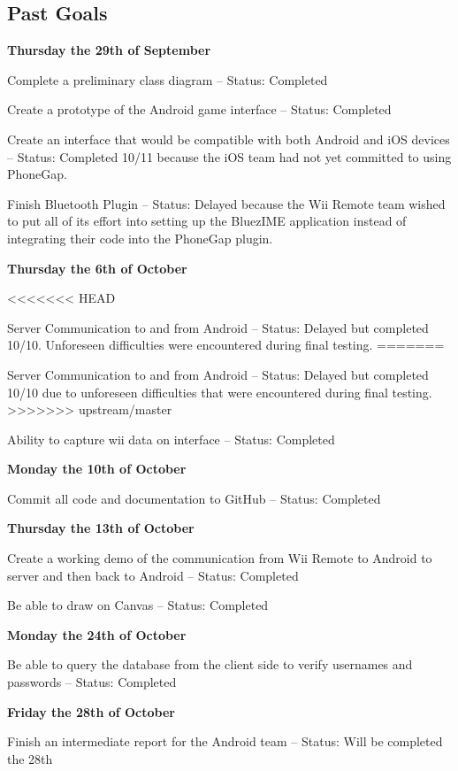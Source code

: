 \documentclass[12pt]{article}
\newenvironment{itemize*}%
  {\begin{itemize}%
  	\setlength{\parsep}{0pt}
    \setlength{\itemsep}{0pt}%
    \setlength{\parskip}{0pt}}%
  {\end{itemize}}
\begin{document}
\subsection{Past Goals}
\textbf{Thursday the 29th of September}
\begin{itemize*}
\item Complete a preliminary class diagram – Status: Completed
\item Create a prototype of the Android game interface – Status: Completed
\item Create an interface that would be compatible with both Android and iOS devices – Status: Completed 10/11 because the iOS team had not yet committed to using PhoneGap.
\item Finish Bluetooth Plugin – Status: Delayed because the Wii Remote team wished to put all of its effort into setting up the BluezIME application instead of integrating their code into the PhoneGap plugin. 
\end{itemize*}
\textbf{Thursday the 6th of October}
\begin{itemize*}
<<<<<<< HEAD
\item Server Communication to and from Android – Status: Delayed but completed 10/10.  Unforeseen difficulties were encountered during final testing.
=======
\item Server Communication to and from Android – Status: Delayed but completed 10/10 due to unforeseen difficulties that were encountered during final testing.
>>>>>>> upstream/master
\item Ability to capture wii data on interface – Status: Completed
\end{itemize*}
\textbf{Monday the 10th of October}
\begin{itemize*}
\item Commit all code and documentation to GitHub – Status: Completed
\end{itemize*}
\textbf{Thursday the 13th of October}
\begin{itemize*}
\item Create a working demo of the communication from Wii Remote to Android to server and then back to Android – Status: Completed
\item Be able to draw on Canvas – Status: Completed
\end{itemize*}
\textbf{Monday the 24th of October}
\begin{itemize*}
\item Be able to query the database from the client side to verify usernames and passwords – Status: Completed
\end{itemize*}
\textbf{Friday the 28th of October}
\begin{itemize*}
\item Finish an intermediate report for the Android team – Status: Will be completed the 28th
\end{itemize*}
\end{document}
